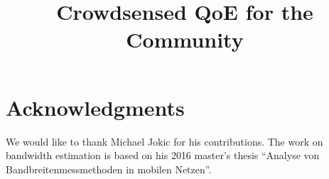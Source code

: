 \documentclass[conference]{IEEEtran}
\begin{document}
\title{Crowdsensed QoE for the Community}



\author{
\and
{}
}

\maketitle









\section*{Acknowledgments}
We would like to thank Michael Jokic for his contributions. The work on bandwidth estimation is based on his 2016 master's thesis ``Analyse von Bandbreitenmessmethoden in mobilen Netzen''.

\balance
\printbibliography
\end{document}
